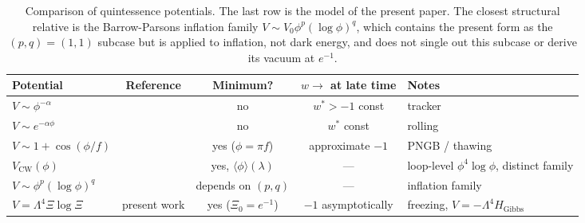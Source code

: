 \documentclass[11pt,reqno]{amsart}
\theoremstyle{plain}
\theoremstyle{definition}
\theoremstyle{remark}
\newcommand{\Gibbs}{\mathrm{Gibbs}}
\begin{document}
\begin{table}[h]
\small
\begin{tabular}{l|c|c|c|l}
Potential & Reference & Minimum? & $w \to$ at late time & Notes\\
\hline
$V \sim \phi^{-\alpha}$ & \cite{RatraPeebles1988} & no & $w^{*} > -1$ const & tracker\\
$V \sim e^{-\alpha\phi}$ & \cite{Wetterich1988} & no & $w^{*}$ const & rolling\\
$V \sim 1 + \cos(\phi/f)$ & \cite{Frieman1995} & yes ($\phi = \pi f$) & approximate $-1$ & PNGB / thawing\\
$V_\text{CW}(\phi)$ & \cite{ColemanWeinberg1973} & yes, $\langle\phi\rangle(\lambda)$ & --- & loop-level $\phi^{4}\log\phi$, distinct family\\
$V \sim \phi^{p}(\log\phi)^{q}$ & \cite{BarrowParsons1995} & depends on $(p,q)$ & --- & inflation family\\
$\boxed{V = \Lambda^{4}\Xi\log\Xi}$ & present work & yes ($\Xi_0 = e^{-1}$) & $-1$ asymptotically & freezing, $V = -\Lambda^{4} H_{\Gibbs}$
\end{tabular}
\caption{Comparison of quintessence potentials. The last row is the
model of the present paper. The closest structural relative is the
Barrow-Parsons inflation family \cite{BarrowParsons1995}
$V \sim V_0 \phi^{p}(\log\phi)^{q}$, which contains the present form as
the $(p,q) = (1,1)$ subcase but is applied to inflation, not dark energy,
and does not single out this subcase or derive its vacuum at $e^{-1}$.}
\label{tab:compare}
\end{table}
\end{document}
